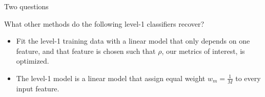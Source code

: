 \documentclass[11pt,compress,t,notes=noshow, aspectratio=169, xcolor=table]{beamer}
\begin{document}

\begin{vbframe}{Two questions}

\vfill
What other methods do the following level-1 classifiers recover?
\vfill
\begin{itemize}
    \item Fit the level-1 training data with a linear model that only depends on one feature, and that feature is chosen such that $\rho$, our metrics of interest, is optimized.
    \item The level-1 model is a linear model that assign equal weight $w_{m} = \frac{1}{M}$ to every input feature.
\end{itemize}
\vfill
    
\end{vbframe}

\end{document}
